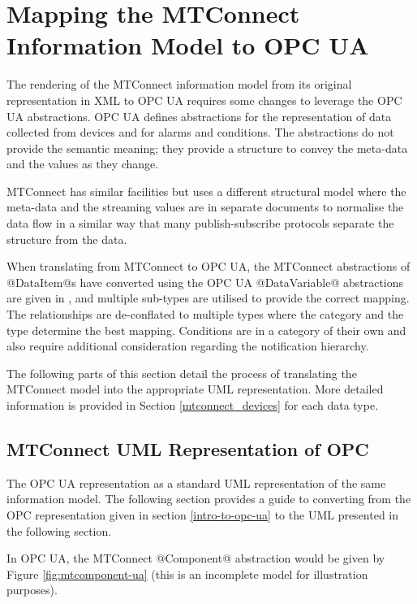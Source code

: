 \section{Mapping the MTConnect Information Model to OPC UA} 
  \label{mtconnec-mapping}
\DefineShortVerb{\@}

The rendering of the MTConnect information model from its original representation in XML to OPC UA requires some changes to leverage the OPC UA abstractions. OPC UA defines abstractions for the representation of data collected from devices and for alarms and conditions. The abstractions do not provide the semantic meaning; they provide a structure to convey the meta-data and the values as they change. 

MTConnect has similar facilities but uses a different structural model where the meta-data and the streaming values are in separate documents to normalise the data flow in a similar way that many publish-subscribe protocols separate the structure from the data.

When translating from MTConnect to OPC UA, the MTConnect abstractions of @DataItem@s have converted using the OPC UA  @DataVariable@ abstractions are given in \cite{UAPart9}, and multiple sub-types are utilised to provide the correct mapping. The relationships are de-conflated to multiple types where the category and the type determine the best mapping. Conditions are in a category of their own and also require additional consideration regarding the notification hierarchy. 

The following parts of this section detail the process of translating the MTConnect model into the appropriate UML representation. More detailed information is provided in Section \ref{mtconnect_devices} for each data type.

\subsection{MTConnect UML Representation of OPC}

The OPC UA representation as a standard UML representation of the same information model. The following section provides a guide to converting from the OPC representation given in section \ref{intro-to-opc-ua} to the UML presented in the following section. 

In OPC UA, the MTConnect @Component@ abstraction would be given by Figure \ref{fig:mtcomponent-ua} (this is an incomplete model for illustration purposes).



